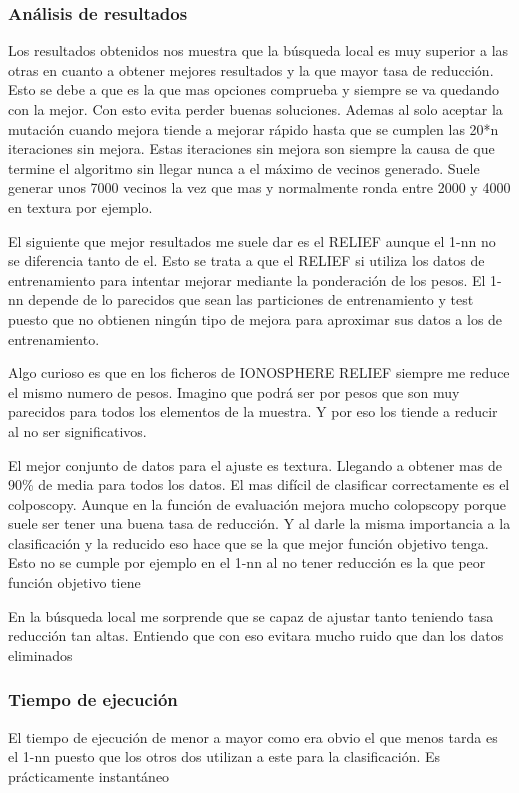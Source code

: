 \documentclass[titlepage]{article}
\begin{document}
	
	
	
	
	
	
	\subsubsection{Análisis de resultados}
	Los resultados obtenidos nos muestra que la búsqueda local es muy superior a las otras en cuanto a obtener mejores resultados y la que mayor tasa de reducción. Esto se debe a que es la que mas opciones comprueba y siempre se va quedando con la mejor. Con esto evita perder buenas soluciones. Ademas al solo aceptar la mutación cuando mejora tiende a mejorar rápido hasta que se cumplen las 20*n iteraciones sin mejora. Estas iteraciones sin mejora son siempre la causa de que termine el algoritmo sin llegar nunca a el máximo de vecinos generado. Suele generar unos 7000 vecinos la vez que mas y normalmente ronda entre 2000 y 4000 en textura por ejemplo.
	
	El siguiente que mejor resultados me suele dar es el RELIEF aunque el 1-nn no se diferencia tanto de el. Esto se trata a que el RELIEF si utiliza los datos de entrenamiento para intentar mejorar mediante la ponderación de los pesos. El 1-nn depende de lo parecidos que sean las particiones de entrenamiento y test puesto que no obtienen ningún tipo de mejora para aproximar sus datos a los de entrenamiento.
	
	Algo curioso es que en los ficheros de IONOSPHERE RELIEF siempre me reduce el mismo numero de pesos. Imagino que podrá ser por pesos que son muy parecidos para todos los elementos de la muestra. Y por eso los tiende a reducir al no ser significativos.
	
	El mejor conjunto de datos para el ajuste es textura. Llegando a obtener mas de 90\% de media para todos los datos. El mas difícil de clasificar correctamente es el colposcopy. Aunque en la función de evaluación mejora mucho colopscopy porque suele ser tener una buena tasa de reducción. Y al darle la misma importancia a la clasificación y la reducido eso hace que se la que mejor función objetivo tenga. Esto no se cumple por ejemplo en el 1-nn al no tener reducción es la que peor función objetivo tiene
	
	En la búsqueda local me sorprende que se capaz de ajustar tanto teniendo tasa reducción tan altas. Entiendo que con eso evitara mucho ruido que dan los datos eliminados
	
	\subsubsection{Tiempo de ejecución}
	El tiempo de ejecución de menor a mayor como era obvio el que menos tarda es el 1-nn puesto que los otros dos utilizan a este para la clasificación. Es prácticamente instantáneo
	
\end{document}
